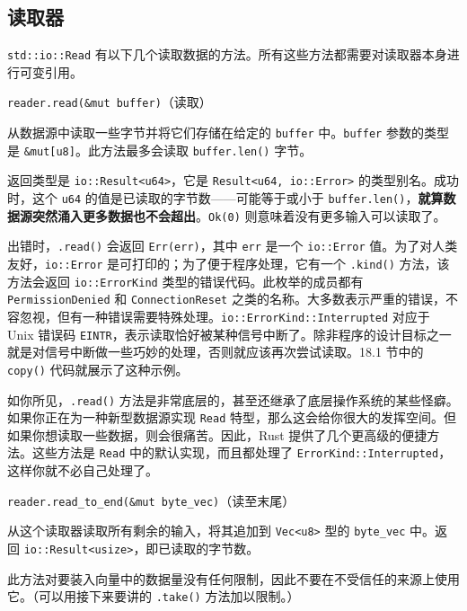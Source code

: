 \subsection{读取器}

\texttt{std::io::Read} 有以下几个读取数据的方法。所有这些方法都需要对读取器本身进行可变引用。

\begin{myNote}
\texttt{reader.read(\&mut buffer)}（读取）
\end{myNote}

从数据源中读取一些字节并将它们存储在给定的 \texttt{buffer} 中。\texttt{buffer} 参数的类型是 \texttt{\&mut[u8]}。此方法最多会读取 \texttt{buffer.len()} 字节。

返回类型是 \texttt{io::Result<u64>}，它是 \texttt{Result<u64, io::Error>} 的类型别名。成功时，这个 \texttt{u64} 的值是已读取的字节数——可能等于或小于 \texttt{buffer.len()}，\textbf{就算数据源突然涌入更多数据也不会超出}。\texttt{Ok(0)} 则意味着没有更多输入可以读取了。

出错时，\texttt{.read()} 会返回 \texttt{Err(err)}，其中 \texttt{err} 是一个 \texttt{io::Error} 值。为了对人类友好，\texttt{io::Error} 是可打印的；为了便于程序处理，它有一个 \texttt{.kind()} 方法，该方法会返回 \texttt{io::ErrorKind} 类型的错误代码。此枚举的成员都有 \texttt{PermissionDenied} 和 \texttt{ConnectionReset} 之类的名称。大多数表示严重的错误，不容忽视，但有一种错误需要特殊处理。\texttt{io::ErrorKind::Interrupted} 对应于 Unix 错误码 \texttt{EINTR}，表示读取恰好被某种信号中断了。除非程序的设计目标之一就是对信号中断做一些巧妙的处理，否则就应该再次尝试读取。18.1 节中的 \texttt{copy()} 代码就展示了这种示例。

如你所见，\texttt{.read()} 方法是非常底层的，甚至还继承了底层操作系统的某些怪癖。如果你正在为一种新型数据源实现 \texttt{Read} 特型，那么这会给你很大的发挥空间。但如果你想读取一些数据，则会很痛苦。因此，Rust 提供了几个更高级的便捷方法。这些方法是 \texttt{Read} 中的默认实现，而且都处理了 \texttt{ErrorKind::Interrupted}，这样你就不必自己处理了。

\begin{myNote}
\texttt{reader.read\_to\_end(\&mut byte\_vec)}（读至末尾）
\end{myNote}

从这个读取器读取所有剩余的输入，将其追加到 \texttt{Vec<u8>} 型的 \texttt{byte\_vec} 中。返回 \texttt{io::Result<usize>}，即已读取的字节数。

此方法对要装入向量中的数据量没有任何限制，因此不要在不受信任的来源上使用它。（可以用接下来要讲的 \texttt{.take()} 方法加以限制。）

